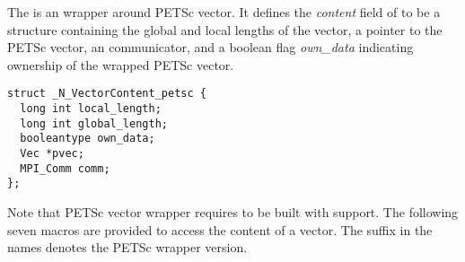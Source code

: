 %
The {\nvecpetsc} is an {\nvector} wrapper around PETSc vector. It defines the 
{\em content} field of  to be a structure containing the global 
and local lengths of the vector, a pointer to the PETSc vector,
an {\mpi} communicator, and a boolean flag {\em own\_data} indicating ownership of 
the wrapped PETSc vector.
\begin{verbatim} 
struct _N_VectorContent_petsc {
  long int local_length;
  long int global_length;
  booleantype own_data;
  Vec *pvec;
  MPI_Comm comm;
};
\end{verbatim}
Note that PETSc vector wrapper requires {\sundials} to be built with {\mpi} support.
The following seven macros are provided to access the content of a {\nvecpetsc}
vector. The suffix  in the names denotes the PETSc wrapper 
version.
